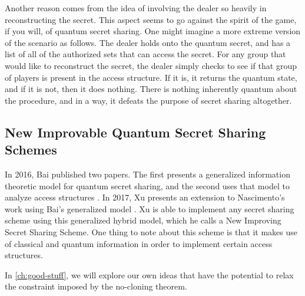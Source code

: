 Another reason comes from the idea of involving the dealer so heavily in reconstructing the secret. This aspect seems to go against the spirit of the game, if you will, of quantum secret sharing. One might imagine a more extreme version of the scenario as follows. The dealer holds onto the quantum secret, and has a list of all of the authorized sets that can access the secret. For any group that would like to reconstruct the secret, the dealer simply checks to see if that group of players is present in the access structure. If it is, it returns the quantum state, and if it is not, then it does nothing. There is nothing inherently quantum about the procedure, and in a way, it defeats the purpose of secret sharing altogether.

\subsection{New Improvable Quantum Secret Sharing Schemes}
\label{ssec:niqss}

In 2016, Bai published two papers. The first presents a generalized information theoretic model for quantum secret sharing, and the second uses that model to analyze access structures \cite{bai_generalized_2016} \cite{bai_quantum_2017}. In 2017, Xu presents an extension to Nascimento's \cite{nascimento_improving_2001} work using Bai's generalized model \cite{xu_new_2017}. Xu is able to implement any secret sharing scheme using this generalized hybrid model, which he calls a New Improving Secret Sharing Scheme. One thing to note about this scheme is that it makes use of classical and quantum information in order to implement certain access structures.

In \cref{ch:good-stuff}, we will explore our own ideas that have the potential to relax the constraint imposed by the no-cloning theorem.
